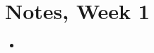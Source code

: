 \documentclass[12pt]{article}
\begin{document}
\section*{Notes, Week 1}

\begin{itemize}
    
    \item 

\end{itemize}
\end{document}
